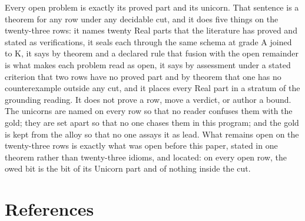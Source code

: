 \documentclass[10pt]{article}
\begin{document}
Every open problem is exactly its proved part and its unicorn. That
sentence is a theorem for any row under any decidable cut, and it does
five things on the twenty-three rows: it names twenty Real parts that
the literature has proved and stated as verifications, it seals each
through the same schema at grade A joined to K, it says by theorem and a
declared rule that fusion with the open remainder is what makes each
problem read as open, it says by assessment under a stated criterion
that two rows have no proved part and by theorem that one has no
counterexample outside any cut, and it places every Real part in a
stratum of the grounding reading. It does not prove a row, move a
verdict, or author a bound. The unicorns are named on every row so that
no reader confuses them with the gold; they are set apart so that no one
chases them in this program; and the gold is kept from the alloy so that
no one assays it as lead. What remains open on the twenty-three rows is
exactly what was open before this paper, stated in one theorem rather
than twenty-three idioms, and located: on every open row, the owed bit
is the bit of its Unicorn part and of nothing inside the cut.

\hypertarget{references}{%
\section{References}\label{references}}
\end{document}
